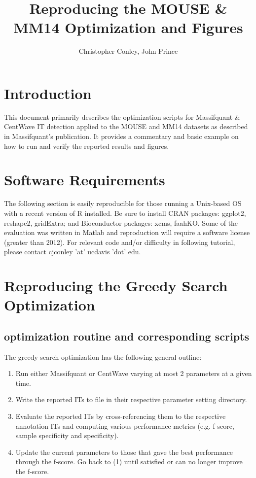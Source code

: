 \documentclass[11pt]{amsart}
\title{Reproducing the MOUSE \& MM14 Optimization and Figures}
\author{Christopher Conley, John Prince}
\date{}                                           %
\begin{document}
\maketitle

\section{Introduction}

This document primarily describes the optimization scripts for Massifquant \& CentWave IT detection applied to the MOUSE and MM14 datasets as described in Massifquant's publication. It provides a commentary and basic example on how to run and verify the reported results and figures. 

\section{Software Requirements}

The following section is easily reproducible for those running a Unix-based OS with a recent version of R installed. Be sure to install CRAN packages: ggplot2, reshape2, gridExtra; and Bioconductor packages: xcms, faahKO. Some of the evaluation was written in Matlab and reproduction will require a software license (greater than 2012).  For relevant code and/or difficulty in following tutorial, please contact cjconley 'at' ucdavis 'dot' edu. 

\section{Reproducing the Greedy Search Optimization}

\subsection{optimization routine and corresponding scripts}
The greedy-search optimization has the following general outline:  
\begin{enumerate}
\item Run either Massifquant or CentWave varying at most 2 parameters at a given time.
\item Write the reported ITs to file in their respective parameter setting directory. 
\item Evaluate the reported ITs by cross-referencing them to the respective annotation ITs and computing various performance metrics (e.g. f-score, sample specificity and specificity). 
\item Update the current parameters to those that gave the best performance through the f-score. Go back to (1) until satisfied or can no longer improve the f-score.
\end{enumerate} 
\end{document}
